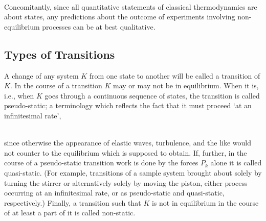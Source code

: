 \documentclass{article}
\theoremstyle{definition}
\begin{document}
\\
\normalfont

Concomitantly, since all quantitative statements of classical thermodynamics are about states, any predictions about the outcome of experiments involving non-equilibrium processes can be at best qualitative.

\subsection{Types of Transitions}
A change of any system \( K \) from one state to another will be called a transition of \( K \). In the course of a transition \( K \) may or may not be in equilibrium. When it is, i.e., when \( K \) goes through a continuous sequence of states, the transition is called pseudo-static; a terminology which reflects the fact that it must proceed ‘at an infinitesimal rate’,

\\
\normalfont
since otherwise the appearance of elastic waves, turbulence, and the like would not counter to the equilibrium which is supposed to obtain. If, further, in the course of a pseudo-static transition work is done by the forces \( P_k \) alone it is called quasi-static. (For example, transitions of a sample system brought about solely by turning the stirrer or alternatively solely by moving the piston, either process occurring at an infinitesimal rate, or as pseudo-static and quasi-static, respectively.) Finally, a transition such that \( K \) is not in equilibrium in the course of at least a part of it is called non-static.
\end{document}

